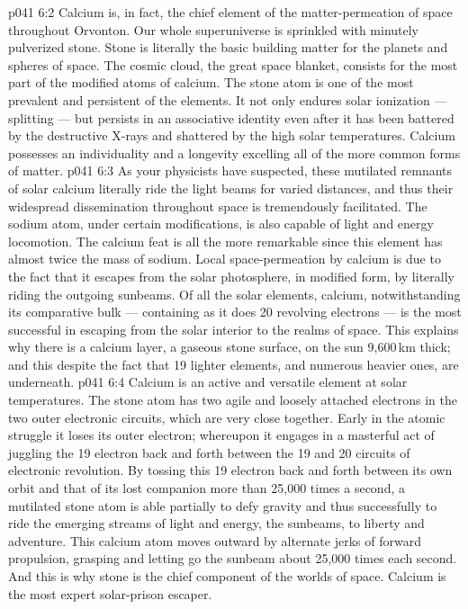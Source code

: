 \vs p041 6:2 Calcium is, in fact, the chief element of the matter\hyp{}permeation of space throughout Orvonton. Our whole superuniverse is sprinkled with minutely pulverized stone. Stone is literally the basic building matter for the planets and spheres of space. The cosmic cloud, the great space blanket, consists for the most part of the modified atoms of calcium. The stone atom is one of the most prevalent and persistent of the elements. It not only endures solar ionization --- splitting --- but persists in an associative identity even after it has been battered by the destructive X\hyp{}rays and shattered by the high solar temperatures. Calcium possesses an individuality and a longevity excelling all of the more common forms of matter.
\vs p041 6:3 \pc As your physicists have suspected, these mutilated remnants of solar calcium literally ride the light beams for varied distances, and thus their widespread dissemination throughout space is tremendously facilitated. The sodium atom, under certain modifications, is also capable of light and energy locomotion. The calcium feat is all the more remarkable since this element has almost twice the mass of sodium. Local space\hyp{}permeation by calcium is due to the fact that it escapes from the solar photosphere, in modified form, by literally riding the outgoing sunbeams. Of all the solar elements, calcium, notwithstanding its comparative bulk --- containing as it does 20 revolving electrons --- is the most successful in escaping from the solar interior to the realms of space. This explains why there is a calcium layer, a gaseous stone surface, on the sun 9,600\,km thick; and this despite the fact that 19 lighter elements, and numerous heavier ones, are underneath.
\vs p041 6:4 Calcium is an active and versatile element at solar temperatures. The stone atom has two agile and loosely attached electrons in the two outer electronic circuits, which are very close together. Early in the atomic struggle it loses its outer electron; whereupon it engages in a masterful act of juggling the 19 electron back and forth between the 19 and 20 circuits of electronic revolution. By tossing this 19 electron back and forth between its own orbit and that of its lost companion more than 25,000 times a second, a mutilated stone atom is able partially to defy gravity and thus successfully to ride the emerging streams of light and energy, the sunbeams, to liberty and adventure. This calcium atom moves outward by alternate jerks of forward propulsion, grasping and letting go the sunbeam about 25,000 times each second. And this is why stone is the chief component of the worlds of space. Calcium is the most expert solar\hyp{}prison escaper.
